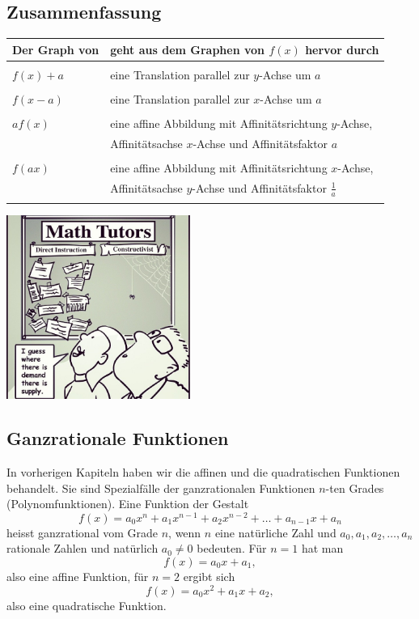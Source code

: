 \documentclass[%
11pt,%
twoside,%
titlepage,%
german,%
headsepline%
]{scrartcl}
\newcommand{\definition}[1]{\colorbox{emerald}{#1}}
\begin{document}
  \subsection{Zusammenfassung}
  
  \begin{tabular}{l|l}
  Der Graph von  & geht aus dem Graphen von $f(x)$ hervor durch\\ \hline\\
  $f(x)+a$ & eine Translation parallel zur $y$-Achse um $a$\\ \\
  $f(x-a)$ & eine Translation parallel zur $x$-Achse um $a$\\ \\
  $af(x)$ & eine affine Abbildung mit Affinitätsrichtung $y$-Achse,\\ 
   & Affinitätsachse $x$-Achse und Affinitätsfaktor $a$\\ \\
  $f(ax)$ & eine affine Abbildung mit Affinitätsrichtung $x$-Achse,\\ 
   & Affinitätsachse $y$-Achse und Affinitätsfaktor $\frac{1}{a}$\\ \\
  \end{tabular}
 
\begin{center}
\includegraphics[width=0.45\textwidth]{pictures/math tutors}
\end{center}

\subsection{Ganzrationale Funktionen}
In vorherigen Kapiteln haben wir die affinen und die quadratischen Funktionen behandelt. Sie sind Spezialfälle der ganzrationalen Funktionen $n$-ten Grades (Polynomfunktionen).
Eine Funktion der Gestalt
$$f(x)=a_0x^n+ a_1x^{n-1} + a_2x^{n-2} + \dots + a_{n-1}x + a_n$$
heisst \definition{ganzrational vom Grade $n$}, wenn $n$ eine natürliche Zahl und $a_0, a_1, a_2,\dots, a_n$ rationale Zahlen und natürlich $a_0\neq0$  bedeuten.
Für $n=1$ hat man
$$f(x)=a_0x+a_1,$$
also eine affine Funktion, für $n=2$ ergibt sich
$$f(x)=a_0x^2+a_1x+a_2,$$
also eine quadratische Funktion.
\end{document}
